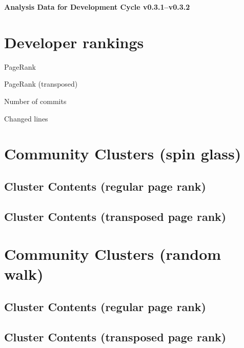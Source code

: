 \documentclass{article}
\begin{document}
\setlength{\parindent}{0pt}
\begin{center}
\begin{Large}
\textbf{Analysis Data for Development Cycle v0.3.1--v0.3.2}
\end{Large}
\end{center}
\section{Developer rankings}
\begin{small}\renewcommand{\tabcolsep}{1pt}
\begin{minipage}{0.5\linewidth}
PageRank\\

\end{minipage}%
\begin{minipage}{0.5\linewidth}
PageRank (transposed)\\

\end{minipage}

\renewcommand{\tabcolsep}{5pt}
\begin{minipage}{0.5\linewidth}
Number of commits\\

\end{minipage}%
\begin{minipage}{0.5\linewidth}
Changed lines\\

\end{minipage}
\end{small}
\newpage\section{Community Clusters (spin glass)}
\subsection{Cluster Contents (regular page rank)}
\newpage\subsection{Cluster Contents (transposed page rank)}
\newpage\section{Community Clusters (random walk)}
\subsection{Cluster Contents (regular page rank)}
\newpage\subsection{Cluster Contents (transposed page rank)}
\end{document}
